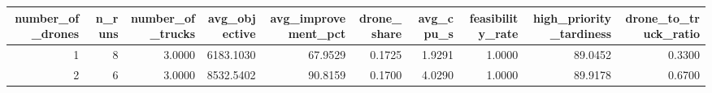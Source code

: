 \begin{tabular}{rrrrrrrrrr}
\toprule
number_of_drones & n_runs & number_of_trucks & avg_objective & avg_improvement_pct & drone_share & avg_cpu_s & feasibility_rate & high_priority_tardiness & drone_to_truck_ratio \\
\midrule
1 & 8 & 3.0000 & 6183.1030 & 67.9529 & 0.1725 & 1.9291 & 1.0000 & 89.0452 & 0.3300 \\
2 & 6 & 3.0000 & 8532.5402 & 90.8159 & 0.1700 & 4.0290 & 1.0000 & 89.9178 & 0.6700 \\
\bottomrule
\end{tabular}
